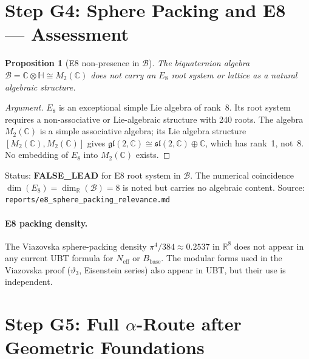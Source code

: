 \documentclass[12pt,a4paper]{article}
\newtheorem{proposition}[theorem]{Proposition}
\theoremstyle{definition}
\theoremstyle{remark}
\begin{document}
\section{Step G4: Sphere Packing and E8 — Assessment}
\label{sec:g5:E8}

\begin{proposition}[E8 non-presence in $\mathcal{B}$]
\label{prop:g5:E8}
The biquaternion algebra $\mathcal{B} = \mathbb{C}\otimes\mathbb{H} \cong M_2(\mathbb{C})$
does \emph{not} carry an $E_8$ root system or lattice as a natural algebraic structure.
\end{proposition}

\begin{proof}[Argument]
$E_8$ is an exceptional simple Lie algebra of rank~8.  Its root system requires
a non-associative or Lie-algebraic structure with 240 roots.  The algebra $M_2(\mathbb{C})$
is a simple associative algebra; its Lie algebra structure $[M_2(\mathbb{C}), M_2(\mathbb{C})]$
gives $\mathfrak{gl}(2,\mathbb{C}) \cong \mathfrak{sl}(2,\mathbb{C}) \oplus \mathbb{C}$,
which has rank~1, not~8.  No embedding of $E_8$ into $M_2(\mathbb{C})$ exists.
\end{proof}

\begin{resultbox}
Status: \textbf{FALSE\_LEAD} for E8 root system in $\mathcal{B}$.  The numerical
coincidence $\dim(E_8) = \dim_\mathbb{R}(\mathcal{B}) = 8$ is noted but carries no
algebraic content.  Source: \texttt{reports/e8\_sphere\_packing\_relevance.md}
\end{resultbox}

\paragraph{E8 packing density.}
The Viazovska sphere-packing density $\pi^4/384 \approx 0.2537$ in $\mathbb{R}^8$
does not appear in any current UBT formula for $N_\mathrm{eff}$ or $B_\mathrm{base}$.
The modular forms used in the Viazovska proof ($\vartheta_3$, Eisenstein series) also
appear in UBT, but their use is independent.

\section{Step G5: Full $\alpha$-Route after Geometric Foundations}
\label{sec:g5:full}
\end{document}
